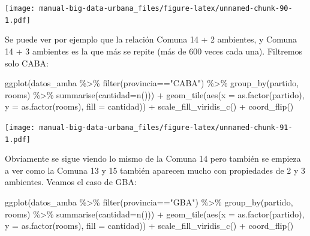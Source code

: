 \documentclass[
  spanish,
]{book}
\newenvironment{Shaded}{\begin{snugshade}}{\end{snugshade}}
\newcommand{\AttributeTok}[1]{\textcolor[rgb]{0.77,0.63,0.00}{#1}}
\newcommand{\FunctionTok}[1]{\textcolor[rgb]{0.00,0.00,0.00}{#1}}
\newcommand{\NormalTok}[1]{#1}
\newcommand{\SpecialCharTok}[1]{\textcolor[rgb]{0.00,0.00,0.00}{#1}}
\newcommand{\StringTok}[1]{\textcolor[rgb]{0.31,0.60,0.02}{#1}}
\begin{document}
\texttt{[image: manual-big-data-urbana\_files/figure-latex/unnamed-chunk-90-1.pdf]}

Se puede ver por ejemplo que la relación Comuna 14 + 2 ambientes, y Comuna 14 + 3 ambientes es la que más se repite (más de 600 veces cada una). Filtremos solo CABA:

\begin{Shaded}
\begin{Highlighting}[]
\FunctionTok{ggplot}\NormalTok{(datos\_amba }\SpecialCharTok{\%\textgreater{}\%}
              \FunctionTok{filter}\NormalTok{(provincia}\SpecialCharTok{==}\StringTok{"CABA"}\NormalTok{) }\SpecialCharTok{\%\textgreater{}\%}
              \FunctionTok{group\_by}\NormalTok{(partido, rooms) }\SpecialCharTok{\%\textgreater{}\%}
              \FunctionTok{summarise}\NormalTok{(}\AttributeTok{cantidad=}\FunctionTok{n}\NormalTok{())) }\SpecialCharTok{+} 
  \FunctionTok{geom\_tile}\NormalTok{(}\FunctionTok{aes}\NormalTok{(}\AttributeTok{x =} \FunctionTok{as.factor}\NormalTok{(partido),}
                \AttributeTok{y =} \FunctionTok{as.factor}\NormalTok{(rooms),}
                \AttributeTok{fill =}\NormalTok{ cantidad)) }\SpecialCharTok{+}
  \FunctionTok{scale\_fill\_viridis\_c}\NormalTok{() }\SpecialCharTok{+}
  \FunctionTok{coord\_flip}\NormalTok{()}
\end{Highlighting}
\end{Shaded}

\texttt{[image: manual-big-data-urbana\_files/figure-latex/unnamed-chunk-91-1.pdf]}

Obviamente se sigue viendo lo mismo de la Comuna 14 pero también se empieza a ver como la Comuna 13 y 15 también aparecen mucho con propiedades de 2 y 3 ambientes. Veamos el caso de GBA:

\begin{Shaded}
\begin{Highlighting}[]
\FunctionTok{ggplot}\NormalTok{(datos\_amba }\SpecialCharTok{\%\textgreater{}\%}
              \FunctionTok{filter}\NormalTok{(provincia}\SpecialCharTok{==}\StringTok{"GBA"}\NormalTok{) }\SpecialCharTok{\%\textgreater{}\%}
              \FunctionTok{group\_by}\NormalTok{(partido, rooms) }\SpecialCharTok{\%\textgreater{}\%}
              \FunctionTok{summarise}\NormalTok{(}\AttributeTok{cantidad=}\FunctionTok{n}\NormalTok{())) }\SpecialCharTok{+} 
  \FunctionTok{geom\_tile}\NormalTok{(}\FunctionTok{aes}\NormalTok{(}\AttributeTok{x =} \FunctionTok{as.factor}\NormalTok{(partido),}
                \AttributeTok{y =} \FunctionTok{as.factor}\NormalTok{(rooms),}
                \AttributeTok{fill =}\NormalTok{ cantidad)) }\SpecialCharTok{+}
  \FunctionTok{scale\_fill\_viridis\_c}\NormalTok{() }\SpecialCharTok{+}
  \FunctionTok{coord\_flip}\NormalTok{()}
\end{Highlighting}
\end{Shaded}
\end{document}
